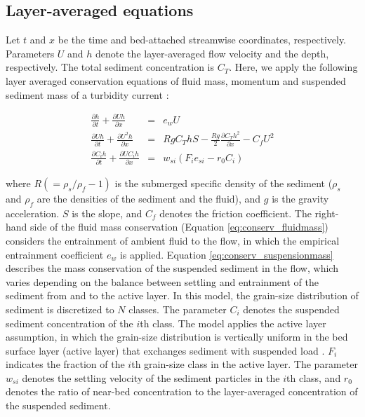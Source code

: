 \subsection{Layer-averaged equations}

Let $t$ and $x$ be the time and bed-attached streamwise coordinates, respectively. Parameters $U$ and $h$ denote the layer-averaged flow velocity and the depth, respectively. The total sediment concentration is $C_T$. Here, we apply the following layer averaged conservation equations of fluid mass, momentum and suspended sediment mass of a turbidity current \citep{parker1986self,kostic2006response}:

\begin{eqnarray}
  \frac{\partial h}{\partial t} + \frac{\partial Uh}{\partial x} & = & e_wU \label{eq:conserv_fluidmass} \\
  \frac{\partial Uh}{\partial t} + \frac{\partial U^2h}{\partial x} & = & R g C_T h S - \frac{Rg}{2}\frac{\partial C_T h^2}{\partial x} - C_f U^{2} \label{eq:conserv_momentum} \\
\frac{\partial C_i h}{\partial t} + \frac{\partial U C_i h}{\partial x} & = & w_{si} (F_i e_{si} - r_0 C_i) \label{eq:conserv_suspensionmass}
\end{eqnarray}

\noindent where $R(=\rho_s/\rho_f - 1)$ is the submerged specific density of the sediment ($\rho_s$ and $\rho_f$ are the densities of the sediment and the fluid), and $g$ is the gravity acceleration. $S$ is the slope, and $C_f$ denotes the friction coefficient. The right-hand side of the fluid mass conservation (Equation \ref{eq:conserv_fluidmass}) considers the entrainment of ambient fluid to the flow, in which the empirical entrainment coefficient $e_w$ is applied. Equation \ref{eq:conserv_suspensionmass} describes the mass conservation of the suspended sediment in the flow, which varies depending on the balance between settling and entrainment of the sediment from and to the active layer. In this model, the grain-size distribution of sediment is discretized to $N$ classes. The parameter $C_i$ denotes the suspended sediment concentration of the $i$th class. The model applies the active layer assumption, in which the grain-size distribution is vertically uniform in the bed surface layer (active layer) that exchanges sediment with suspended load \citep{Hirano1971}. $F_i$ indicates the fraction of the $i$th grain-size class in the active layer. The parameter $w_{si}$ denotes the settling velocity of the sediment particles in the $i$th class, and $r_0$ denotes the ratio of near-bed concentration to the layer-averaged concentration of the suspended sediment.

